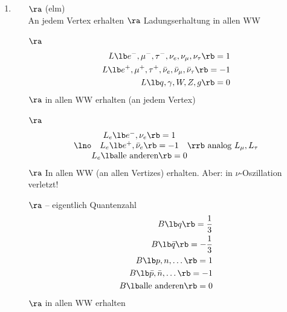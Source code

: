 \begin{enumerate}
\item {}
\begin{itemize}
\item[$\ra$]  (elm)\\
An jedem Vertex erhalten $\ra$ Ladungserhaltung in allen WW
\item[$\ra$] 
\begin{align}
\begin{split}
L\lb  e^-,\mu^-,\tau^-,\nu_e, \nu_\mu, \nu_\tau \rb  =1\\
L\lb e^+,\mu^+,\tau^+,\bar{\nu}_e, \bar{\nu}_\mu, \bar{\nu}_\tau \rb  = -1\\
L\lb  q, \gamma, W, Z, g\rb  = 0
\end{split}
\end{align}
$\ra$ in allen WW erhalten (an jedem Vertex)
\item[$\ra$] 
\begin{align}
\begin{split}
\lno \begin{matrix}
L_e \lb  e^-, \nu_e\rb  = 1\\
L_e \lb  e^+, \bar{\nu}_e\rb  = -1\\
L_e\lb \text{alle anderen}\rb  = 0
\end{matrix} \rrb\text{ analog } L_\mu, L_\tau
\end{split}
\end{align}
$\ra$ In allen WW (an allen Vertizes) erhalten. Aber: in $\nu$-Oszillation verletzt!
\item[$\ra$]  -- eigentlich Quantenzahl
\begin{align}
\begin{split}
B\lb q\rb  = \frac{1}{3}\\
B\lb \bar{q}\rb  = -\frac{1}{3}\\
B\lb  p,n,\dots\rb  = 1\\B\lb  \bar{p}, \bar{n},\dots \rb  = -1\\
B\lb  \text{alle anderen}\rb  = 0
\end{split}
\end{align}
$\ra$ in allen WW erhalten
\end{itemize}
\end{enumerate}
